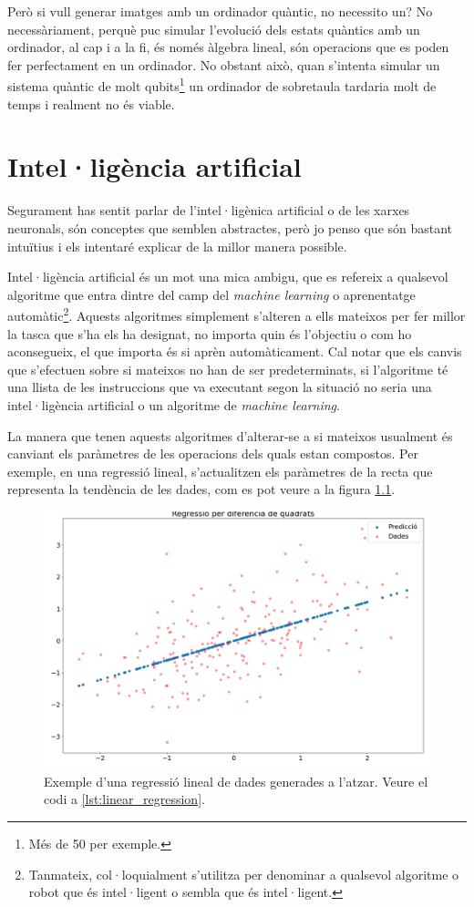 Però si vull generar imatges amb un ordinador quàntic, no necessito un? No necessàriament, perquè puc simular l'evolució dels estats quàntics amb un ordinador, al cap i a la fi, és només àlgebra lineal, són operacions que es poden fer perfectament en un ordinador. No obstant això, quan s'intenta simular un sistema quàntic de molt qubits\footnote{Més de 50 per exemple.} un ordinador de sobretaula tardaria molt de temps i realment no és viable.


\chapter{Intel·ligència artificial}

Segurament has sentit parlar de l'intel·ligènica artificial o de les xarxes neuronals, són conceptes que semblen abstractes, però jo penso que són bastant intuïtius i els intentaré explicar de la millor manera possible.

Intel·ligència artificial és un mot una mica ambigu, que es refereix a qualsevol algoritme que entra dintre del camp del \textit{machine learning} o aprenentatge automàtic\footnote{Tanmateix, col·loquialment s'utilitza per denominar a qualsevol algoritme o robot que és intel·ligent o sembla que és intel·ligent. }. Aquests algoritmes simplement s'alteren a ells mateixos per fer millor la tasca que s'ha els ha designat, no importa quin és l'objectiu o com ho aconsegueix, el que importa és si aprèn automàticament. Cal notar que els canvis que s'efectuen sobre si mateixos no han de ser predeterminats, si l'algoritme té una llista de les instruccions que va executant segon la situació no seria una intel·ligència artificial o un algoritme de \textit{machine learning}.

La manera que tenen aquests algoritmes d'alterar-se a si mateixos usualment és canviant els paràmetres de les operacions dels quals estan compostos. Per exemple, en una regressió lineal, s'actualitzen els paràmetres de la recta que representa la tendència de les dades, com es pot veure a la figura \ref{fig:leastsquares}.

\begin{figure}
	\centering
	\includegraphics[width=0.7\linewidth]{Figures/least_squares}
	\caption{Exemple d'una regressió lineal de dades generades a l'atzar. Veure el codi a \ref{lst:linear_regression}.}
	\label{fig:leastsquares}
\end{figure}

